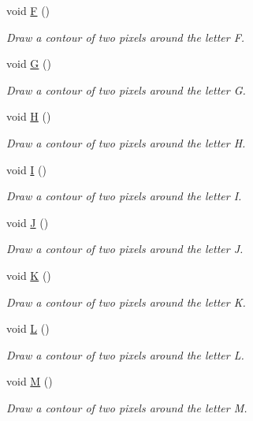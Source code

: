 \begin{DoxyCompactItemize}
void \mbox{\hyperlink{class_font_v3_af7d35b85d63aeeb5d625cf9623bc3eec}{F}} ()
\begin{DoxyCompactList}\small\item\em Draw a contour of two pixels around the letter F. \end{DoxyCompactList}\item 
void \mbox{\hyperlink{class_font_v3_af526fbb6a2dfc0855b4ac12ffdfcba93}{G}} ()
\begin{DoxyCompactList}\small\item\em Draw a contour of two pixels around the letter G. \end{DoxyCompactList}\item 
void \mbox{\hyperlink{class_font_v3_a1baccebcd243a2d49f5b2be99685ce99}{H}} ()
\begin{DoxyCompactList}\small\item\em Draw a contour of two pixels around the letter H. \end{DoxyCompactList}\item 
void \mbox{\hyperlink{class_font_v3_a0ff9be83c43611b0beffaa2373d35809}{I}} ()
\begin{DoxyCompactList}\small\item\em Draw a contour of two pixels around the letter I. \end{DoxyCompactList}\item 
void \mbox{\hyperlink{class_font_v3_af40c11f0274f7b91ca52abaf8e4a4a6b}{J}} ()
\begin{DoxyCompactList}\small\item\em Draw a contour of two pixels around the letter J. \end{DoxyCompactList}\item 
void \mbox{\hyperlink{class_font_v3_aaa525c66f157b432238af0da208b378b}{K}} ()
\begin{DoxyCompactList}\small\item\em Draw a contour of two pixels around the letter K. \end{DoxyCompactList}\item 
void \mbox{\hyperlink{class_font_v3_a8270dc86776fefb9f74cfc9bcf0abfe4}{L}} ()
\begin{DoxyCompactList}\small\item\em Draw a contour of two pixels around the letter L. \end{DoxyCompactList}\item 
void \mbox{\hyperlink{class_font_v3_a97d06d45014094a6b0aa35e3cd21255a}{M}} ()
\begin{DoxyCompactList}\small\item\em Draw a contour of two pixels around the letter M. \end{DoxyCompactList}\item 

\end{DoxyCompactItemize}

